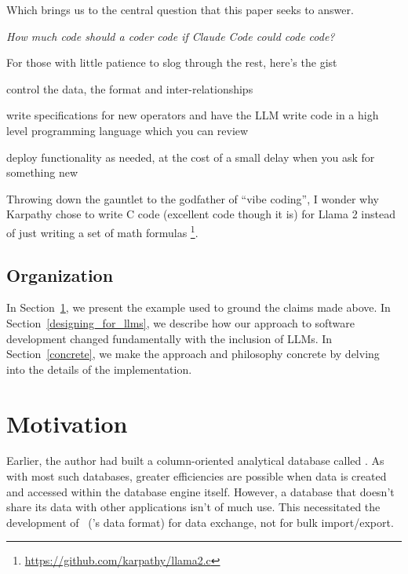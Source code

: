 \documentclass[letterpaper,12pt]{article}
\begin{document}
Which brings us to the central question that this paper seeks to answer.
\begin{center}
{\em How much code should a coder code if Claude Code could code code?}
\end{center}

For those with little patience to slog through the rest, here's the gist
\be
\item control the data, the format and inter-relationships
\item write specifications for new operators and have the LLM write code in a
  high level programming language which you can review 
\item deploy functionality as needed, at the cost of a small 
  delay when you ask for something new
  \ee

Throwing down the gauntlet to the godfather of ``vibe coding'', 
I wonder why Karpathy chose to write C code (excellent code though it is)
for Llama 2 instead of just writing a set of math formulas
\footnote{\url{https://github.com/karpathy/llama2.c}}.

\subsection{Organization}
In Section~\ref{motivation}, we present the example used to 
ground the claims made above. 
In Section~\ref{designing_for_llms}, we describe how 
our approach to software development changed fundamentally with the inclusion of
LLMs.
In Section~\ref{concrete}, we make the approach and philosophy concrete by 
delving into the details of the implementation.

\section{Motivation}
\label{motivation}

Earlier, 
the author had built a column-oriented analytical database called \Q. 
As with most such databases, greater efficiencies are possible
when data is created and accessed within the database
engine itself. 
However, a database that doesn't share its data with other applications isn't of
much use. This necessitated the development of \QDF\ (\Q's data format) for data
exchange, not for bulk import/export.
\end{document}
